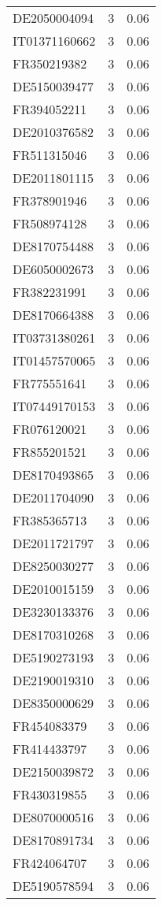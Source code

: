 \begin{table*}[htbp]
\begin{tabular}{lrr}
DE2050004094 & 3 & 0.06 \\
IT01371160662 & 3 & 0.06 \\
FR350219382 & 3 & 0.06 \\
DE5150039477 & 3 & 0.06 \\
FR394052211 & 3 & 0.06 \\
DE2010376582 & 3 & 0.06 \\
FR511315046 & 3 & 0.06 \\
DE2011801115 & 3 & 0.06 \\
FR378901946 & 3 & 0.06 \\
FR508974128 & 3 & 0.06 \\
DE8170754488 & 3 & 0.06 \\
DE6050002673 & 3 & 0.06 \\
FR382231991 & 3 & 0.06 \\
DE8170664388 & 3 & 0.06 \\
IT03731380261 & 3 & 0.06 \\
IT01457570065 & 3 & 0.06 \\
FR775551641 & 3 & 0.06 \\
IT07449170153 & 3 & 0.06 \\
FR076120021 & 3 & 0.06 \\
FR855201521 & 3 & 0.06 \\
DE8170493865 & 3 & 0.06 \\
DE2011704090 & 3 & 0.06 \\
FR385365713 & 3 & 0.06 \\
DE2011721797 & 3 & 0.06 \\
DE8250030277 & 3 & 0.06 \\
DE2010015159 & 3 & 0.06 \\
DE3230133376 & 3 & 0.06 \\
DE8170310268 & 3 & 0.06 \\
DE5190273193 & 3 & 0.06 \\
DE2190019310 & 3 & 0.06 \\
DE8350000629 & 3 & 0.06 \\
FR454083379 & 3 & 0.06 \\
FR414433797 & 3 & 0.06 \\
DE2150039872 & 3 & 0.06 \\
FR430319855 & 3 & 0.06 \\
DE8070000516 & 3 & 0.06 \\
DE8170891734 & 3 & 0.06 \\
FR424064707 & 3 & 0.06 \\
DE5190578594 & 3 & 0.06 \\

\end{tabular}
\end{table*}
